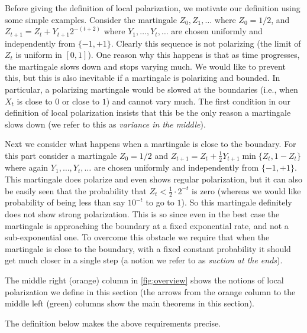 \documentclass[11pt]{article}
\begin{document}
Before giving the definition of local polarization, we motivate our definition using some simple examples. Consider the  martingale $Z_0,Z_1,\ldots$ where  $Z_0 = 1/2$, and $Z_{t+1} = Z_t +Y_{t+1} 2^{-(t+2)}$ where $Y_1,\ldots,Y_t,\ldots$ are chosen uniformly and independently from $\{-1,+1\}$. Clearly this sequence is not polarizing (the limit of $Z_t$ is uniform in $[0,1]$). One reason why this happens is that as time progresses, the martingale slows down and stops varying much. We would like to prevent this, but this is also inevitable if a martingale is polarizing and bounded. In particular, a polarizing martingale would be slowed at the boundaries (i.e., when $X_t$ is close to $0$ or close to $1$) and cannot vary much. The first condition in our definition of local polarization insists that this be the only reason a martingale slows down (we refer to this as {\em variance in the middle}).

Next we consider what happens when a martingale is close to the boundary. For this part consider a martingale $Z_0 = 1/2$ and $Z_{t+1} = Z_t + \frac12 Y_{t+1} \min\{Z_t,1-Z_t\}$ where again $Y_1,\ldots,Y_t,\ldots$ are chosen uniformly and independently from $\{-1,+1\}$. This martingale does polarize and even shows regular polarization, but it can also be easily seen that the probability that $Z_t < \frac12 \cdot 2^{-t}$ is zero (whereas we would like probability of being less than say $10^{-t}$ to go to $1$). So this martingale definitely does not show strong polarization. This is so since even in the best case the martingale is approaching the boundary at a fixed exponential rate, and not a sub-exponential one. To overcome this obstacle we require that when the martingale is close to the boundary, with a fixed constant probability it should get much closer in a single step (a notion we refer to as {\em suction at the ends}).

The middle right (orange) column in \cref{fig:overview} shows the notions of local polarization we define in this section (the arrows from the orange column to the middle left (green) columns show the main theorems in this section).

The definition below makes the above requirements precise.
\end{document}
